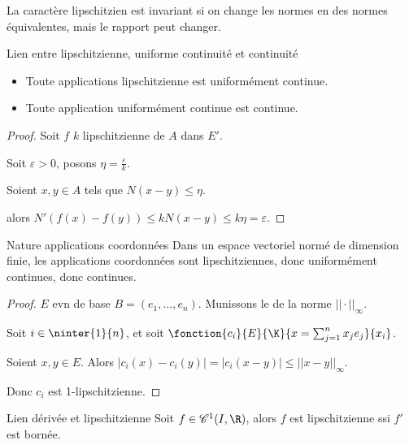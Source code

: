 \begin{remarque}
    La caractère lipschitzien est invariant si on change les normes en des normes 
    équivalentes, mais le rapport peut changer.
\end{remarque}

\begin{proposition}{Lien entre lipschitzienne, uniforme continuité et continuité}{}
    \begin{itemize}
        \item Toute applications lipschitzienne est uniformément continue. 

        \item Toute application uniformément continue est continue.
    \end{itemize}
\end{proposition}


\begin{proof}
    Soit $f$ $k$ lipschitzienne de $A$ dans $E'$.

    Soit $\varepsilon > 0$, posons $\eta = \frac \varepsilon k$.

    Soient $x, y \in A$ tels que $N(x - y) \leqslant \eta$.

    alors $N'(f(x) - f(y)) \leqslant k N(x - y) \leqslant k \eta = \varepsilon$.

\end{proof}

\begin{proposition}{Nature applications coordonnées}{}
    Dans un espace vectoriel normé de dimension finie, les applications coordonnées sont lipschitziennes, 
    donc uniformément continues, donc continues. 
\end{proposition}


\begin{proof}
    $E$ evn de base $B = (e_1, \ldots, e_n)$. Munissons le de la norme $||\cdot||_\infty$.

    Soit $i \in \ninter{1}{n}$, et soit $\fonction{c_i}{E}{\K}{x = \sum_{j=1}^n x_j e_j}{x_i}$.

    Soient $x, y \in E$. Alors $|c_i(x) - c_i(y)| = |c_i(x - y) | \leqslant ||x - y||_\infty$.

    Donc $c_i$ est 1-lipschitzienne. 
\end{proof}


\begin{theoreme}{Lien dérivée et lipschitzienne}{}
    Soit $f \in \mathscr C^1(I, \R)$, alors $f$ est lipschitzienne ssi $f'$ est bornée.
\end{theoreme}


